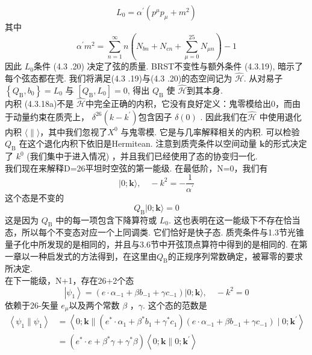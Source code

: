 \begin{equation}
L_{0}=\alpha^{\prime}\left(p^{\mu} p_{\mu}+m^{2}\right)
\end{equation}
其中
\begin{equation}
\alpha^{\prime} m^{2}=\sum_{n=1}^{\infty} n\left(N_{b n}+N_{c n}+\sum_{\mu=0}^{25} N_{\mu n}\right)-1
\end{equation}
因此 $L_{0}$条件 (4.3 .20) 决定了弦的质量. BRST不变性与额外条件 (4.3.19), 暗示了每个弦态都在壳. 我们将满足(4.3 .19)与(4.3 .20)的态空间记为 $\hat{\mathscr{H}}$. 从对易子 $\left\{Q_{\mathrm{B}}, b_{0}\right\}=L_{0}$ 与 $\left[Q_{\mathrm{B}}, L_{0}\right]=0$, 得出 $Q_{\mathrm{B}}$ 使 $\hat{\mathscr{H}}$到其本身.\\
内积 (4.3.18a)不是 $\hat{\mathscr{H}} $中完全正确的内积，它没有良好定义：鬼零模给出0，而由于动量约束在质壳上， $\delta^{26}\left(k-k^{\prime}\right)$包含因子 $\delta(0)$ . 因此我们在$\hat{\mathscr{H}}$ 中使用退化内积 $\langle\|\rangle$，其中我们忽视了$X^{0}$ 与鬼零模. 它是与几率解释相关的内积. 可以检验 $Q_{\mathrm{B}}$ 在这个退化内积下依旧是Hermitean. 注意到质壳条件以空间动量 $\mathbf{k}$的形式决定了 $k^{0}$ (我们集中于进入情况) ，并且我们已经使用了态的协变归一化.\\
我们现在来解释D=26平坦时空弦的第一能级. 在最低阶，N=0，我们有
\begin{equation}
|0 ; \mathbf{k}\rangle, \quad-k^{2}=-\frac{1}{\alpha^{\prime}}
\end{equation}
这个态是不变的
\begin{equation}
Q_{\mathrm{B}}|0 ; \mathbf{k}\rangle=0
\end{equation}
这是因为 $Q_{\mathrm{B}}$ 中的每一项包含下降算符或 $L_{0}$. 这也表明在这一能级下不存在恰当态，所以每个不变态对应一个上同调类. 它们恰好是快子态. 质壳条件与1.3节光锥量子化中所发现的是相同的，并且与3.6节中开弦顶点算符中得到的是相同的. 在第一章以一种启发式的方法得到，在这里由$Q_{\mathrm{B}}$的正规序列常数确定，被幂零的要求所决定.\\
在下一能级，N+1，存在26+2个态
\begin{equation}
\left|\psi_{1}\right\rangle=\left(e \cdot \alpha_{-1}+\beta b_{-1}+\gamma c_{-1}\right)|0 ; \mathbf{k}\rangle, \quad-k^{2}=0
\end{equation}
依赖于26-矢量 $e_{\mu}$以及两个常数 $\beta$ ，$\gamma$. 这个态的范数是
\begin{equation}
\begin{aligned}
\left\langle\psi_{1} \| \psi_{1}\right\rangle &=\left\langle 0 ; \mathbf{k} \|\left(e^{*} \cdot \alpha_{1}+\beta^{*} b_{1}+\gamma^{*} c_{1}\right)\left(e \cdot \alpha_{-1}+\beta b_{-1}+\gamma c_{-1}\right) \mid 0 ; \mathbf{k}^{\prime}\right\rangle \\
&=\left(e^{*} \cdot e+\beta^{*} \gamma+\gamma^{*} \beta\right)\left\langle 0 ; \mathbf{k} \| 0 ; \mathbf{k}^{\prime}\right\rangle
\end{aligned}
\end{equation}
